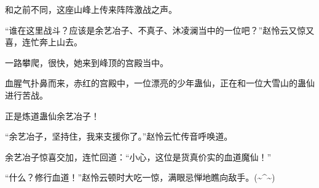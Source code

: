 \begin{this_body}
和之前不同，这座山峰上传来阵阵激战之声。

“谁在这里战斗？应该是余艺冶子、不真子、沐凌澜当中的一位吧？”赵怜云又惊又喜，连忙奔上山去。

一路攀爬，很快，她来到峰顶的宫殿当中。

血腥气扑鼻而来，赤红的宫殿中，一位漂亮的少年蛊仙，正在和一位大雪山的蛊仙进行苦战。

正是炼道蛊仙余艺冶子！

“余艺冶子，坚持住，我来支援你了。”赵怜云忙传音呼唤道。

余艺冶子惊喜交加，连忙回道：“小心，这位是货真价实的血道魔仙！”

“什么？修行血道！”赵怜云顿时大吃一惊，满眼忌惮地瞧向敌手。(\~{}\^{}\~{})

\end{this_body}

